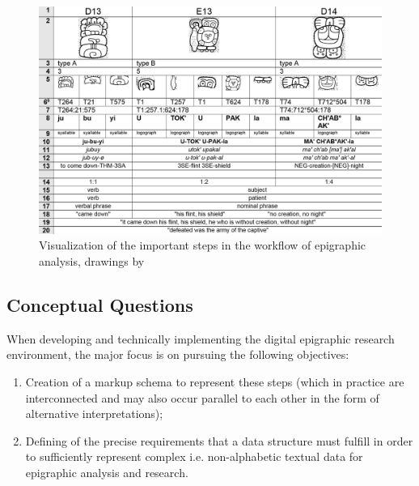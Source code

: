 \documentclass[amsthm,ebook]{saparticle}
\begin{document}
\begin{figure}[!hbp]
\centering
 \includegraphics[width=\columnwidth]{EAGLE2016submission8revisedx-img001.png}
\caption{Visualization of the important steps in the workflow of epigraphic analysis, drawings by \citet{Prager2015}}
\label{fig:1}
\end{figure}





\subsection[Conceptual Questions]{Conceptual Questions}
When developing and technically implementing the digital epigraphic research environment, the major focus is on pursuing
the following objectives: 
\begin{enumerate}
\item Creation of a markup schema to represent these steps (which in practice are interconnected
and may also occur parallel to each other in the form of alternative interpretations); 
\item Defining of the precise requirements that a data structure must fulfill in order to sufficiently represent complex
i.e. non-alphabetic textual data for epigraphic analysis and research. 
\end{enumerate}
\end{document}
